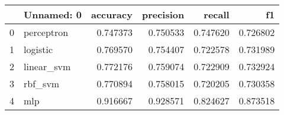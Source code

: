 \begin{tabular}{llrrrr}
\toprule
 & Unnamed: 0 & accuracy & precision & recall & f1 \\
\midrule
0 & perceptron & 0.747373 & 0.750533 & 0.747620 & 0.726802 \\
1 & logistic & 0.769570 & 0.754407 & 0.722578 & 0.731989 \\
2 & linear_svm & 0.772176 & 0.759074 & 0.722909 & 0.732924 \\
3 & rbf_svm & 0.770894 & 0.758015 & 0.720205 & 0.730358 \\
4 & mlp & 0.916667 & 0.928571 & 0.824627 & 0.873518 \\
\bottomrule
\end{tabular}
